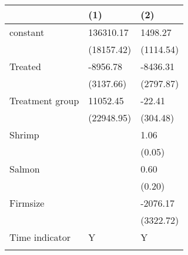 \begin{tabular}{lll}
\toprule
{} &         (1) &        (2) \\
\midrule
constant        &   136310.17 &    1498.27 \\
                &  (18157.42) &  (1114.54) \\
Treated         &    -8956.78 &   -8436.31 \\
                &   (3137.66) &  (2797.87) \\
Treatment group &    11052.45 &     -22.41 \\
                &  (22948.95) &   (304.48) \\
Shrimp          &             &       1.06 \\
                &             &     (0.05) \\
Salmon          &             &       0.60 \\
                &             &     (0.20) \\
Firmsize        &             &   -2076.17 \\
                &             &  (3322.72) \\
Time indicator  &           Y &          Y \\
                &             &            \\
\bottomrule
\end{tabular}
